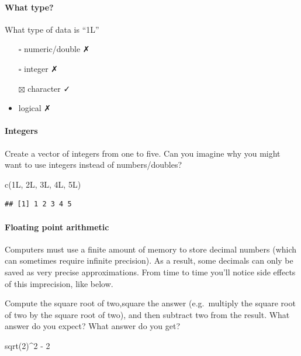 \documentclass[
]{article}
\newenvironment{Shaded}{\begin{snugshade}}{\end{snugshade}}
\newcommand{\DecValTok}[1]{\textcolor[rgb]{0.00,0.00,0.81}{#1}}
\newcommand{\FunctionTok}[1]{\textcolor[rgb]{0.00,0.00,0.00}{#1}}
\newcommand{\NormalTok}[1]{#1}
\newcommand{\SpecialCharTok}[1]{\textcolor[rgb]{0.00,0.00,0.00}{#1}}
\providecommand{\tightlist}{%
  \setlength{\itemsep}{0pt}\setlength{\parskip}{0pt}}
\begin{document}
\hypertarget{what-type}{%
\paragraph{What type?}\label{what-type}}

What type of data is ``1L''

\begin{itemize}
\tightlist
\item[$\square$]
  numeric/double ✗
\item[$\square$]
  integer ✗
\item[$\boxtimes$]
  character ✓
\item
  logical ✗
\end{itemize}

\hypertarget{integers}{%
\paragraph{Integers}\label{integers}}

Create a vector of integers from one to five. Can you imagine why you
might want to use integers instead of numbers/doubles?

\begin{Shaded}
\begin{Highlighting}[]
\FunctionTok{c}\NormalTok{(1L, 2L, 3L, 4L, 5L)}
\end{Highlighting}
\end{Shaded}

\begin{verbatim}
## [1] 1 2 3 4 5
\end{verbatim}

\hypertarget{floating-point-arithmetic}{%
\paragraph{Floating point arithmetic}\label{floating-point-arithmetic}}

Computers must use a finite amount of memory to store decimal numbers
(which can sometimes require infinite precision). As a result, some
decimals can only be saved as very precise approximations. From time to
time you'll notice side effects of this imprecision, like below.

Compute the square root of two,square the answer (e.g.~multiply the
square root of two by the square root of two), and then subtract two
from the result. What answer do you expect? What answer do you get?

\begin{Shaded}
\begin{Highlighting}[]
\FunctionTok{sqrt}\NormalTok{(}\DecValTok{2}\NormalTok{)}\SpecialCharTok{\^{}}\DecValTok{2} \SpecialCharTok{{-}} \DecValTok{2}
\end{Highlighting}
\end{Shaded}
\end{document}
